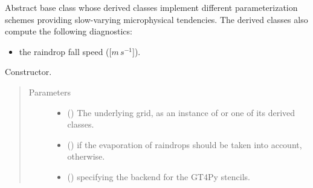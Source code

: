 \documentclass[letterpaper,10pt,english]{sphinxmanual}
\begin{document}

\begin{fulllineitems}
\label{\detokenize{api:parameterizations.slow_tendencies.SlowTendencyMicrophysics}}
Abstract base class whose derived classes implement different parameterization schemes providing
slow-varying microphysical tendencies. The derived classes also compute the following diagnostics:
\begin{itemize}
\item {} 
the raindrop fall speed ({[}\(m \, s^{-1}\){]}).

\end{itemize}

\begin{fulllineitems}
\label{\detokenize{api:parameterizations.slow_tendencies.SlowTendencyMicrophysics.__init__}}
Constructor.
\begin{quote}\begin{description}
\item[{Parameters}] \leavevmode\begin{itemize}
\item {} 
 () \textendash{} The underlying grid, as an instance of {\hyperref[\detokenize{api:grids.grid_xyz.GridXYZ}]{}} or one of its derived classes.

\item {} 
 () \textendash{}  if the evaporation of raindrops should be taken into account,  otherwise.

\item {} 
 () \textendash{}  specifying the backend for the GT4Py stencils.

\end{itemize}

\end{description}\end{quote}


\end{fulllineitems}
\end{fulllineitems}
\end{document}
